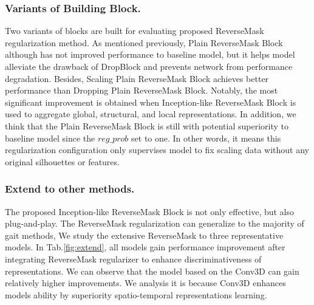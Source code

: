 \documentclass[runningheads]{llncs}
\begin{document}
\subsubsection{Variants of Building Block.} Two variants of blocks are built for evaluating proposed ReverseMask regularization method. As mentioned previously, Plain ReverseMask Block although has not improved performance to baseline model, but it helps model alleviate the drawback of DropBlock and prevents network from performance degradation. Besides, Scaling Plain ReverseMask Block achieves better performance than Dropping Plain ReverseMask Block. Notably, the most significant improvement is obtained when Inception-like ReverseMask Block is used to aggregate global, structural, and local representations. In addition, we think that the Plain ReverseMask Block is still with potential superiority to baseline model since the $reg\_prob$ set to one. In other words, it means this regularization configuration only supervises model to fix scaling data without any original silhouettes or features. 


\subsubsection{Extend to other methods.} The proposed Inception-like ReverseMask Block is not only effective, but also plug-and-play. The ReverseMask regularization can generalize to the majority of gait methods, We study the extensive ReverseMask to three representative models. In Tab.\ref{fig:extend}, all models gain performance improvement after integrating ReverseMask regularizer to enhance discriminativeness of representations. We can observe that the model based on the Conv3D can gain relatively higher improvements. We analysis it is because Conv3D enhances models ability by superiority spatio-temporal representations learning.
\end{document}
